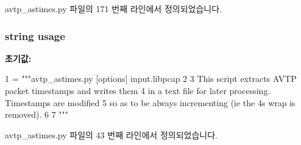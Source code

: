 avtp\+\_\+astimes.\+py 파일의 171 번째 라인에서 정의되었습니다.

\subsubsection[{\texorpdfstring{usage}{usage}}]{\setlength{\rightskip}{0pt plus 5cm}string usage}\hypertarget{namespaceavtp__astimes_a61e5f066c879e5430d8f713c2c3a8b31}{}\label{namespaceavtp__astimes_a61e5f066c879e5430d8f713c2c3a8b31}
{\bfseries 초기값\+:}
\begin{DoxyCode}
1 = \textcolor{stringliteral}{"""avtp\_astimes.py [options] input.libpcap}
2 \textcolor{stringliteral}{}
3 \textcolor{stringliteral}{This script extracts AVTP packet timestamps and writes them}
4 \textcolor{stringliteral}{in a text file for later processing. Timestamps are modified}
5 \textcolor{stringliteral}{so as to be always incrementing (ie the 4s wrap is removed).}
6 \textcolor{stringliteral}{}
7 \textcolor{stringliteral}{"""}
\end{DoxyCode}


avtp\+\_\+astimes.\+py 파일의 43 번째 라인에서 정의되었습니다.

